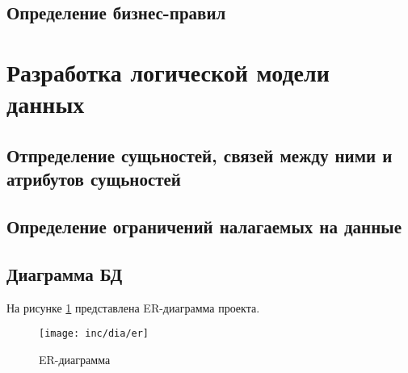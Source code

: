 \subsection{Определение бизнес-правил}

\section{Разработка логической модели данных}

\subsection{Отпределение сущьностей, связей между ними и атрибутов сущьностей}

\subsection{Определение ограничений налагаемых на данные}


\subsection{Диаграмма БД}
На рисунке \ref{fig:er} представлена ER-диаграмма проекта.
\begin{landscape}
\begin{figure}
  \centering
  \texttt{[image: inc/dia/er]}
  \caption{ER-диаграмма}
  \label{fig:er}
\end{figure}
\end{landscape}





